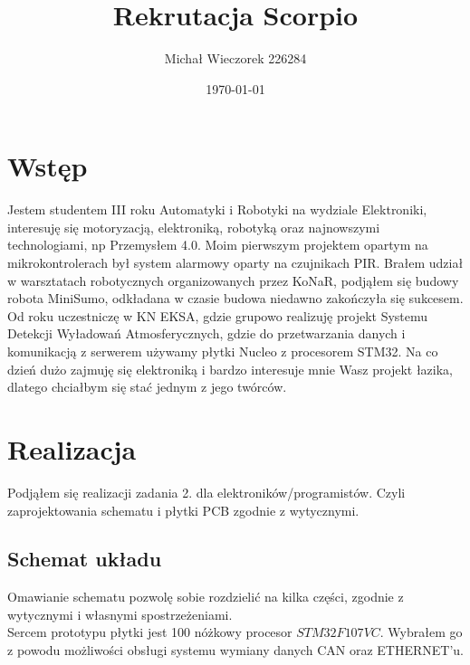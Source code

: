 \documentclass[12pt]{article}
\title{\textbf{Rekrutacja Scorpio}}
\author{Michał Wieczorek {226284}}
\date{\today}
\begin{document}
\maketitle
\newpage
\section{Wstęp}
Jestem studentem III roku Automatyki i Robotyki na wydziale Elektroniki, interesuję się motoryzacją, elektroniką, robotyką oraz najnowszymi technologiami, np Przemysłem 4.0. Moim pierwszym projektem opartym na mikrokontrolerach był system alarmowy oparty na czujnikach PIR. Brałem udział w warsztatach robotycznych organizowanych przez KoNaR, podjąłem się budowy robota MiniSumo, odkładana w czasie budowa niedawno zakończyła się sukcesem. Od roku uczestniczę w KN EKSA, gdzie grupowo realizuję projekt Systemu Detekcji Wyładowań Atmosferycznych, gdzie do przetwarzania danych i komunikacją z serwerem używamy płytki Nucleo z procesorem STM32. Na co dzień dużo zajmuję się elektroniką i bardzo interesuje mnie Wasz projekt łazika, dlatego chciałbym się stać jednym z jego twórców.

\section{Realizacja}
Podjąłem się realizacji zadania 2. dla elektroników/programistów. Czyli zaprojektowania schematu i płytki PCB zgodnie z wytycznymi. 
\subsection{Schemat układu}
Omawianie schematu pozwolę sobie rozdzielić na kilka części, zgodnie z wytycznymi i własnymi spostrzeżeniami. \\
Sercem prototypu płytki jest 100 nóżkowy procesor $STM32F107VC$. Wybrałem go z powodu możliwości obsługi systemu wymiany danych CAN oraz ETHERNET'u.
\end{document}
